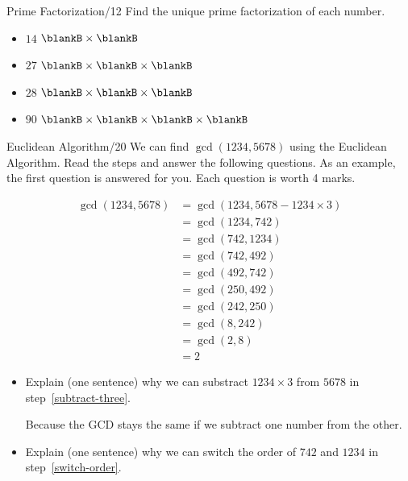 \documentclass[12pt,letterpaper]{article}
\begin{document}
\begin{problem}{Prime Factorization\hfill/12}
 Find the unique prime factorization of each number.

 \begin{itemize}
  \item $14$ \hfill $\blankB \times \blankB$
  \item $27$ \hfill $\blankB \times \blankB \times \blankB$
  \item $28$ \hfill $\blankB \times \blankB \times \blankB$
  \item $90$ \hfill $\blankB \times \blankB \times \blankB \times \blankB$
 \end{itemize}
\end{problem}

\begin{problem}{Euclidean Algorithm\hfill/20}
  We can find \(\gcd(1234, 5678)\) using the Euclidean Algorithm. Read the steps and answer
  the following questions. As an example, the first question is answered for you. Each
  question is worth 4 marks.

  \begin{align}
    \label{subtract-three}
    \gcd(1234, 5678) &= \gcd(1234, 5678 - 1234 \times 3) \\
    &= \gcd(1234, 742) \\
    \label{switch-order}
    &= \gcd(742, 1234) \\
    \label{another-step}
    &= \gcd(742, 492) \\
    &= \gcd(492, 742) \\
    &= \gcd(250, 492) \\
    &= \gcd(242, 250) \\
    &= \gcd(8, 242) \\
    \label{last-simplify}
    &= \gcd(2, 8) \\
    &= 2
  \end{align}

  \begin{itemize}
    \item Explain (one sentence) why we can substract \(1234 \times 3\) from \(5678\) in
    step~\ref{subtract-three}.

    {\selectfont Because the GCD stays the same if we subtract one number
    from the other.}

    \item Explain (one sentence) why we can switch the order of \(742\) and \(1234\) in
    step~\ref{switch-order}.


\end{itemize}
\end{problem}
\end{document}
